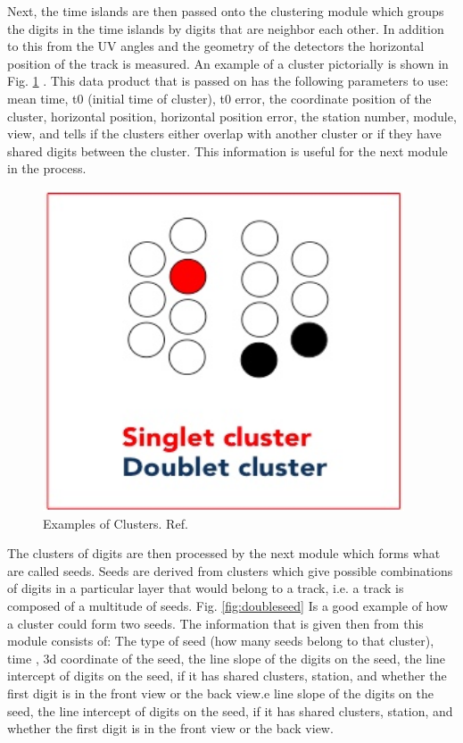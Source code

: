 \documentclass[./Thesis]{subfiles}
\begin{document}
	Next, the time islands are then passed onto the clustering module which groups the digits in the time islands by digits that are neighbor each other.  In addition to this from the UV angles and the geometry of the detectors the horizontal position of the track is measured.  An example of a cluster pictorially is shown in Fig. \ref{fig:cluster} .  This data product that is passed on has the following parameters to use: mean time, t0 (initial time of cluster), t0 error, the coordinate position of the cluster, horizontal position, horizontal position error, the station number, module, view, and tells if the clusters either overlap with another cluster or if they have shared digits between the cluster. This information is useful for the next module in the process.
	
\begin{figure}
	\centerline{\includegraphics[height=95mm]{Clusters.jpeg}}
	\caption[Cluster Example]{ Examples of Clusters.  Ref. \cite{trackerWiki}
	}
	\label{fig:cluster}
\end{figure} 
	
	The clusters of digits are then processed by the next module which forms what are called seeds.  Seeds are derived from clusters which give possible combinations of digits in a particular layer that would belong to a track, i.e. a track is composed of a multitude of seeds.  Fig. \ref{fig:doubleseed} Is a good example of how a cluster could form two seeds.  The information that is given then from this module consists of: The type of seed (how many seeds belong to that cluster), time , 3d coordinate of the seed, the line slope of the digits on the seed, the line intercept of digits on the seed, if it has shared clusters, station, and whether the first digit is in the front view or the back view.e line slope of the digits on the seed, the line intercept of digits on the seed, if it has shared clusters, station, and whether the first digit is in the front view or the back view.
\end{document}
